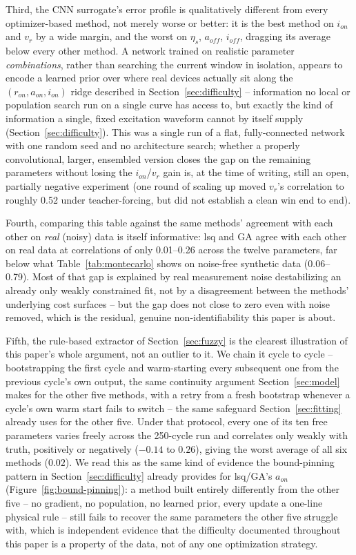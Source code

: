 \documentclass[11pt]{article}
\begin{document}
Third, the CNN surrogate's error profile is qualitatively different from
every optimizer-based method, not merely worse or better: it is the best
method on $i_{on}$ and $v_r$ by a wide margin, and the worst on $\eta_s$,
$a_{off}$, $i_{off}$, dragging its average below every other method. A
network trained on realistic parameter \emph{combinations}, rather than
searching the current window in isolation, appears to encode a learned
prior over where real devices actually sit along the $(r_{on},a_{on},i_{on})$
ridge described in Section~\ref{sec:difficulty} -- information no local or
population search run on a single curve has access to, but exactly the kind
of information a single, fixed excitation waveform cannot by itself supply
(Section~\ref{sec:difficulty}). This was a single run of a flat,
fully-connected network with one random seed and no architecture search;
whether a properly convolutional, larger, ensembled version closes the gap
on the remaining parameters without losing the $i_{on}$/$v_r$ gain is, at
the time of writing, still an open, partially negative experiment (one
round of scaling up moved $v_r$'s correlation to roughly 0.52 under
teacher-forcing, but did not establish a clean win end to end).

Fourth, comparing this table against the same methods' agreement with each
other on \emph{real} (noisy) data is itself informative: lsq and GA agree
with each other on real data at correlations of only 0.01--0.26 across the
twelve parameters, far below what Table~\ref{tab:montecarlo} shows on
noise-free synthetic data (0.06--0.79). Most of that gap is explained by
real measurement noise destabilizing an already only weakly constrained
fit, not by a disagreement between the methods' underlying cost surfaces --
but the gap does not close to zero even with noise removed, which is the
residual, genuine non-identifiability this paper is about.

Fifth, the rule-based extractor of Section~\ref{sec:fuzzy} is the
clearest illustration of this paper's whole argument, not an outlier to
it. We chain it cycle to cycle -- bootstrapping the first cycle and
warm-starting every subsequent one from the previous cycle's own
output, the same continuity argument Section~\ref{sec:model} makes for
the other five methods, with a retry from a fresh bootstrap whenever a
cycle's own warm start fails to switch -- the same safeguard Section~\ref{sec:fitting}
already uses for the other five. Under that protocol, every one of its
ten free parameters varies freely across the 250-cycle run and
correlates only weakly with truth, positively or negatively
($-0.14$ to $0.26$), giving the worst average of all six methods
($0.02$). We read this as the same kind of evidence the bound-pinning
pattern in Section~\ref{sec:difficulty} already provides for lsq/GA's
$a_{on}$ (Figure~\ref{fig:bound-pinning}): a method built entirely
differently from the other five -- no gradient, no population, no
learned prior, every update a one-line physical rule -- still fails to
recover the same parameters the other five struggle with, which is
independent evidence that the difficulty documented throughout this
paper is a property of the data, not of any one optimization strategy.
\end{document}

